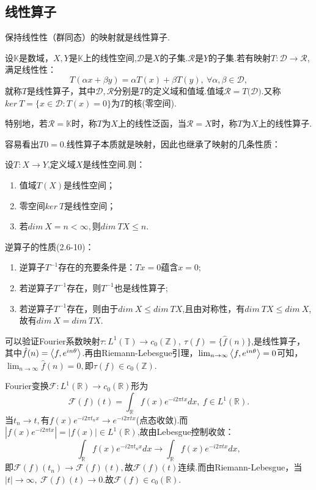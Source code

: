 \documentclass[lang=cn,10pt]{elegantbook}
\begin{document}
	\subsection{线性算子}
	保持线性性（群同态）的映射就是线性算子.
	\begin{definition}[线性算子]
		设\(\mathbb{K}\)是数域，\(X,Y\)是\(\mathbb{K}\)上的线性空间,\(\mathcal{D}\)是\(X\)的子集.\(\mathcal{R}\)是\(Y\)的子集.若有映射\(T:\mathcal{D}\rightarrow{\mathcal{R}}\),满足线性性：
		\[T(\alpha x+\beta y)=\alpha T(x)+\beta T(y),\ \forall \alpha,\beta \in \mathcal{D},\]
		就称\(T\)是线性算子，其中\(\mathcal{D,R}\)分别是\(T\)的定义域和值域.值域\(\mathcal{R}=T(\mathcal{D)}\).又称\(ker\ T=\{x\in \mathcal{D}:T(x)=0\}\)为\(T\)的核(零空间).
		
		特别地，若\(\mathcal{R}=\mathbb{K}\)时，称\(T\)为\(X\)上的线性泛函，当\(\mathcal{R}=X\)时，称\(T\)为\(X\)上的线性算子.
	\end{definition}
	容易看出\(T0=0\).线性算子本质就是映射，因此也继承了映射的几条性质：
	\begin{property}[2.6-9]
		设\(T:X\rightarrow{Y}\),定义域\(X\)是线性空间.则：
		\begin{enumerate}
			\item 值域\(T(X)\)是线性空间；
			\item 零空间\(ker\ T\)是线性空间；
			\item 若\(dim\ X=n<\infty,\)则\(dim\ TX\le n.\)
		\end{enumerate}
		逆算子的性质(2.6-10)：
		\begin{enumerate}
			\item 逆算子\(T^{-1}\)存在的充要条件是：\(Tx=0\)蕴含\(x=0\);
			\item 若逆算子\(T^{-1}\)存在，则\(T^{-1}\)也是线性算子;
			\item 若逆算子\(T^{-1}\)存在，则由于\(dim\ X\le dim\ TX\),且由对称性，有\(dim\ TX\le dim\ X\),故有\(dim\ X= dim\ TX\).
		\end{enumerate}
	\end{property}
	\begin{example}
		可以验证Fourier系数映射\(\tau:L^1(\mathbb{T})\rightarrow{c_0(\mathbb{Z})},\ \tau(f)=\{\hat{f}(n)\}\),是线性算子，其中\(\hat{f}(n)=\Braket{f,e^{in\theta}}\).再由Riemann-Lebesgue引理，\(\lim_{n\to \infty}{\Braket{f,e^{in\theta}}}=0\)可知，\(\lim_{n\to \infty}\hat{f}(n)=0,\)即\(\tau(f)\in c_0(\mathbb{Z})\).
	\end{example}
	\begin{example}
		Fourier变换\(\mathcal{F}:L^1(\mathbb{R})\rightarrow{c_0(\mathbb{R})}\)形为
		\[\mathcal{F}(f)(t)=\int_\mathbb{R}f(x)e^{-i2\pi tx}dx,\ f\in L^1(\mathbb{R}).\]
		当\(t_n\to t,\)有\(f(x)e^{-i2\pi t_nx}\to e^{-i2\pi tx}\)(点态收敛).而\(|f(x)e^{-i2\pi tx}|=|f(x)|\in L^1(\mathbb{R})\),故由Lebesgue控制收敛：
		\[\int_\mathbb{R}f(x)e^{-i2\pi t_nx}dx\to \int_\mathbb{R}f(x)e^{-i2\pi tx}dx,\]
		即\(\mathcal{F}(f)(t_n)\to \mathcal{F}(f)(t),\)故\(\mathcal{F}(f)(t)\)连续.而由Riemann-Lebesgue，当\(|t|\to \infty,\ \mathcal{F}(f)(t)\to 0.\)故\(\mathcal{F}(f)\in c_0(\mathbb{R}).\)
	\end{example}
	
\end{document}
